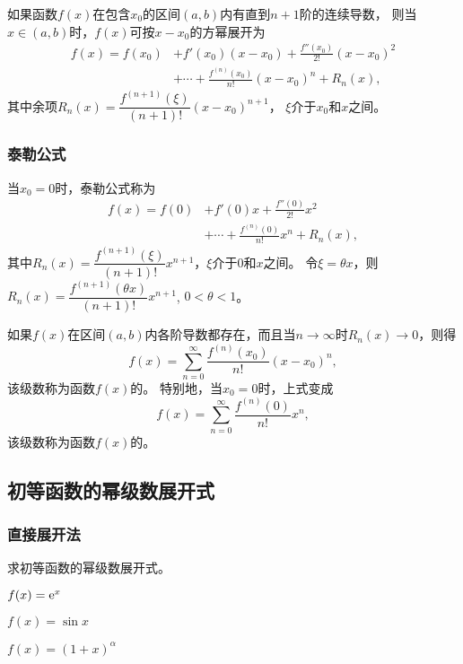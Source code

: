 \documentclass[14pt,notheorems,leqno,xcolor={rgb}]{beamer} %
\begin{document}
\begin{frame}
\begin{theorem*}[泰勒公式]
如果函数$f(x)$在包含$x_0$的区间$(a,b)$内有直到$n+1$阶的连续导数，
则当$x\in(a,b)$时，$f(x)$可按$x-x_0$的方幂展开为
\begin{align*}
  f(x)=f(x_0)&+f'(x_0)(x-x_0)+\frac{f''(x_0)}{2!}(x-x_0)^2\\
             &+\cdots+\frac{f^{(n)}(x_0)}{n!}(x-x_0)^n+R_n(x),
\end{align*}
\pause
其中余项$R_n(x)=\dfrac{f^{(n+1)}(\xi)}{(n+1)!}(x-x_0)^{n+1}$，%
$\xi$介于$x_0$和$x$之间。
\end{theorem*}
\end{frame}

\begin{frame}
\frametitle{泰勒公式}
当$x_0=0$时，泰勒公式称为
\begin{align*}
  f(x)=f(0)&+f'(0)x+\frac{f''(0)}{2!}x^2\\
             &+\cdots+\frac{f^{(n)}(0)}{n!}x^n+R_n(x),
\end{align*}
\pause
其中$R_n(x)=\dfrac{f^{(n+1)}(\xi)}{(n+1)!}x^{n+1}$，$\xi$介于$0$和$x$之间。
\ppause
令$\xi=\theta x$，则$R_n(x)=\dfrac{f^{(n+1)}(\theta x)}{(n+1)!}x^{n+1}$, $0<\theta<1$。
\end{frame}

\begin{frame}
如果$f(x)$在区间$(a,b)$内各阶导数都存在，而且当$n\to\infty$时$R_n(x)\to0$，则得
\[f(x)=\sum\limits_{n=0}^{\infty}\frac{f^{(n)}(x_0)}{n!}(x-x_0)^n,\]
该级数称为函数$f(x)$的。
\vpause
特别地，当$x_0=0$时，上式变成
\[f(x)=\sum\limits_{n=0}^{\infty}\frac{f^{(n)}(0)}{n!}x^n,\]
该级数称为函数$f(x)$的。
\end{frame}

\subsection{初等函数的幂级数展开式}

\begin{frame}
\frametitle{直接展开法}
\begin{example}
求初等函数的幂级数展开式。
\begin{enumlite}[<+->]
  \item $f(x)=\mathrm{e}^x$
  \item $f(x)=\sin x$
  \item $f(x)=(1+x)^{\alpha}$
\end{enumlite}
\end{example}
\end{frame}
\end{document}

